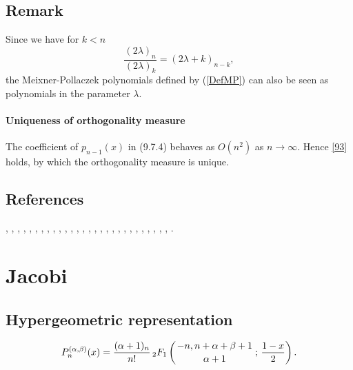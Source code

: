 \documentclass[envcountchap,graybox]{svmono}
\newcommand{\hyp}[5]{\mbox{}_{#1}{F}_{#2}
\left(\genfrac{}{}{0pt}{}{#3}{#4}\,;\,#5\right)}
\newcommand\iy\infty
\begin{document}
\subsection*{Remark}
Since we have for $k<n$
$$\frac{(2\lambda)_n}{(2\lambda)_k}=(2\lambda+k)_{n-k},$$
the Meixner-Pollaczek polynomials defined by (\ref{DefMP}) can also be seen as polynomials
in the parameter $\lambda$.
\label{sec9.7}
%
\paragraph{Uniqueness of orthogonality measure}
The coefficient of $p_{n-1}(x)$ in (9.7.4) behaves as $O(n^2)$ as $n\to\iy$.
Hence \eqref{93} holds, by which the orthogonality measure is unique.
%

\subsection*{References}
\cite{AlSalam90}, \cite{AlSalamChihara76}, \cite{AndrewsAskey85}, \cite{Araaya2004},
\cite{Araaya2005}, \cite{Askey89I}, \cite{AskeyWilson85}, \cite{AtakRahmanSuslov},
\cite{AtakSuslov88}, \cite{CharrisIsmail}, \cite{ChenIsmail97}, \cite{Chihara78},
\cite{Ismail85II}, \cite{Ismail94}, \cite{Ismail2005II}, \cite{IsmailLi},
\cite{IsmailStanton97}, \cite{Koekoek2000}, \cite{Koorn88}, \cite{Koorn89II},
\cite{LabelleYehI}, \cite{LabelleYehII}, \cite{Lesky95II}, \cite{LiWong}, \cite{Meixner},
\cite{Nikiforov+}, \cite{Rahman78I}, \cite{Wilson80}, \cite{Wimp90}.


\section{Jacobi}

\par\setcounter{equation}{0}

\subsection*{Hypergeometric representation}
\begin{equation}
\label{DefJacobi}
P_n^{(\alpha,\beta)}(x)=\frac{(\alpha+1)_n}{n!}\,
\hyp{2}{1}{-n,n+\alpha+\beta+1}{\alpha+1}{\frac{1-x}{2}}.
\end{equation}
\end{document}
